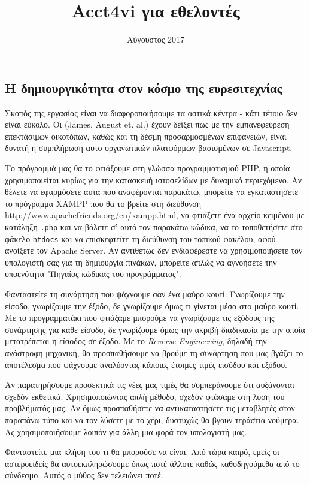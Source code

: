 \documentclass[12pt,a4paper]{extarticle}
\title{Acct4vi για εθελοντές}
\author{}
\date{Αύγουστος 2017}
\begin{document}
 
 
 \tableofcontents
 
 \setcounter{section}{2}
 
 \subsection{Η δημιουργικότητα στον κόσμο της ευρεσιτεχνίας}
 Σκοπός της εργασίας είναι να διαφοροποιήσουμε τα αστικά κέντρα - κάτι τέτοιο δεν είναι εύκολο. Οι (James, August et. al.) έχουν δείξει πως με την εμπανεφεύρεση επεκτάσιμων οικοτόπων, καθώς και τη δέσμη προσαρμοσμένων επιφανειών, είναι δυνατή η συμπλήρωση αυτο-οργανωτικών πλατφόρμων βασισμένων σε Javascript.
 
Το πρόγραμμά μας θα το φτιάξουμε στη γλώσσα προγραμματισμού PHP, η οποία χρησιμοποιείται κυρίως για την κατασκευή ιστοσελίδων με δυναμικό περιεχόμενο. Αν θέλετε να εφαρμόσετε αυτά που αναφέρονται παρακάτω, μπορείτε να εγκαταστήσετε το πρόγραμμα XAMPP που θα το βρείτε στη διεύθυνση \url{http://www.apachefriends.org/en/xampp.html}, να φτιάξετε ένα αρχείο κειμένου με κατάληξη \texttt{.php} και να βάλετε σ' αυτό τον παρακάτω κώδικα, να το τοποθετήσετε στο φάκελο \texttt{htdocs} και να επισκεφτείτε τη διεύθυνση του τοπικού φακέλου, αφού ανοίξετε τον Apache Server. Αν αντιθέτως δεν ενδιαφέρεστε να χρησιμοποιήσετε τον υπολογιστή σας για τη δημιουργία πινάκων, μπορείτε απλώς να αγνοήσετε την υποενότητα "Πηγαίος κώδικας του προγράμματος".

Φανταστείτε τη συνάρτηση που ψάχνουμε σαν ένα μαύρο κουτί: Γνωρίζουμε την είσοδο, γνωρίζουμε την έξοδο, δε γνωρίζουμε όμως τι γίνεται μέσα στο μαύρο κουτί. Με το προγραμματάκι που φτιάξαμε μπορούμε να γνωρίζουμε τις εξόδους της συνάρτησης για κάθε είσοδο, δε γνωρίζουμε όμως την ακριβή διαδικασία με την οποία μετατρέπεται η είσοδος σε έξοδο. Με το \textit{Reverse Engineering}, δηλαδή την ανάστροφη μηχανική, θα προσπαθήσουμε να βρούμε τη συνάρτηση που μας βγάζει το αποτέλεσμα που ψάχνουμε αναλύοντας κάποιες έτοιμες τιμές εισόδου και εξόδου.

Αν παρατηρήσουμε προσεκτικά τις νέες μας τιμές θα συμπεράνουμε ότι αυξάνονται σχεδόν εκθετικά.
Χρησιμοποιώντας απλή μέθοδο, σχεδόν φτάσαμε στη λύση του προβλήματός μας. Αν όμως προσπαθήσετε να αντικαταστήσετε τις μεταβλητές στον παραπάνω τύπο και να τον λύσετε με το χέρι, δυστυχώς θα βγουν τεράστια νούμερα. Ας χρησιμοποιήσουμε λοιπόν για άλλη μια φορά τον υπολογιστή μας.

 
 Φανταστείτε μια κλήση του τι θα μπορούσε να είναι. Από τώρα καιρό, εμείς οι αστεροειδείς θα αυτοεκπληρώσουμε όπως ποτέ άλλοτε καθώς καθοδηγούμεθα από το σύνδεσμο. Αυτός ο μύθος δεν τελειώνει ποτέ.
 
\end{document}
